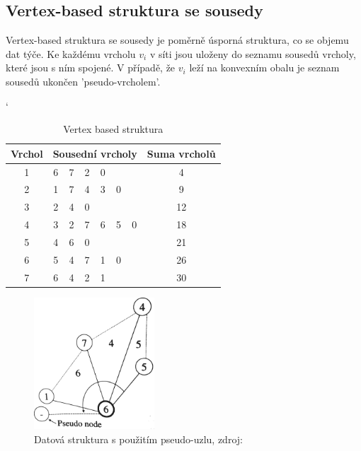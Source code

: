 \documentclass[12pt,a4paper]{article}
\begin{document}
{\subsection{Vertex-based struktura se sousedy}

Vertex-based struktura se sousedy je poměrně úsporná struktura, co se
objemu dat týče. Ke každému vrcholu $v_i$ v síti jsou uloženy do
seznamu sousedů vrcholy, které jsou s ním spojené. V případě, že $v_i$
leží na konvexním obalu je seznam sousedů ukončen 'pseudo-vrcholem'.

\begin{table}[h]
\catcode`
\begin{tabular}{|c||c|c|c|c|c|c||c|}
\hline
Vrchol & \multicolumn{6}{|c|}{Sousední vrcholy} & Suma vrcholů \\ \hline \hline
1      & 6    & 7    & 2    & 0    &     &     & 4            \\ \hline
2      & 1    & 7    & 4    & 3    & 0   &     & 9            \\ \hline
3      & 2    & 4    & 0    &      &     &     & 12           \\ \hline
4      & 3    & 2    & 7    & 6    & 5   & 0   & 18           \\ \hline
5      & 4    & 6    & 0    &      &     &     & 21           \\ \hline
6      & 5    & 4    & 7    & 1    & 0   &     & 26           \\ \hline
7      & 6    & 4    & 2    & 1    &     &     & 30           \\ \hline
\end{tabular}
\caption{Vertex based struktura}
\label{tab:vertex_based}
\end{table}

\begin{figure}[h!]
\centering
\includegraphics[width=0.4\textwidth]{img/pseudo_node.png}
\caption{Datová struktura s použitím pseudo-uzlu, zdroj: \cite{triangulation}}
\label{fig:pseudo_node}
\end{figure}

}
\end{document}
